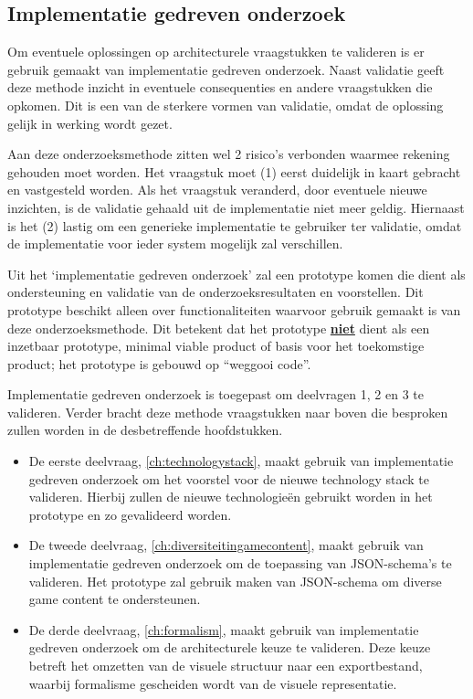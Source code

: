 \pagebreak
\subsection{Implementatie gedreven onderzoek}
Om eventuele oplossingen op architecturele vraagstukken te valideren is er gebruik gemaakt van implementatie gedreven onderzoek. Naast validatie geeft deze methode inzicht in eventuele consequenties en andere vraagstukken die opkomen. Dit is een van de sterkere vormen van validatie, omdat de oplossing gelijk in werking wordt gezet.

Aan deze onderzoeksmethode zitten wel 2 risico’s verbonden waarmee rekening gehouden moet worden\cite{ResearchSkillsInComputerScience}. Het vraagstuk moet (1) eerst duidelijk in kaart gebracht en vastgesteld worden. Als het vraagstuk veranderd, door eventuele nieuwe inzichten, is de validatie gehaald uit de implementatie niet meer geldig. Hiernaast is het (2) lastig om een generieke implementatie te gebruiker ter validatie, omdat de implementatie voor ieder system mogelijk zal verschillen.

Uit het ‘implementatie gedreven onderzoek’ zal een prototype komen die dient als ondersteuning en validatie van de onderzoeksresultaten en voorstellen. Dit prototype beschikt alleen over functionaliteiten waarvoor gebruik gemaakt is van deze onderzoeksmethode. Dit betekent dat het prototype \underline{\textbf{niet}} dient als een inzetbaar prototype, minimal viable product of basis voor het toekomstige product; het prototype is gebouwd op “weggooi code”.

Implementatie gedreven onderzoek is toegepast om deelvragen 1, 2 en 3 te valideren. Verder bracht deze methode vraagstukken naar boven die besproken zullen worden in de desbetreffende hoofdstukken.

\begin{itemize}
    \item De eerste deelvraag, \autoref{ch:technologystack}, maakt gebruik van implementatie gedreven onderzoek om het voorstel voor de nieuwe technology stack te valideren. Hierbij zullen de nieuwe technologieën gebruikt worden in het prototype en zo gevalideerd worden.
    \item De tweede deelvraag, \autoref{ch:diversiteitingamecontent}, maakt gebruik van implementatie gedreven onderzoek om de toepassing van JSON-schema’s te valideren. Het prototype zal gebruik maken van JSON-schema om diverse game content te ondersteunen.
    \item De derde deelvraag, \autoref{ch:formalism}, maakt gebruik van implementatie gedreven onderzoek om de architecturele keuze te valideren. Deze keuze betreft het omzetten van de visuele structuur naar een exportbestand, waarbij formalisme gescheiden wordt van de visuele representatie.
\end{itemize}
    
